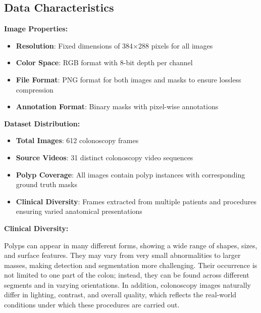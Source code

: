 \documentclass[a4paper,12pt]{report}
\begin{document}
\subsection{Data Characteristics}
\vspace{1em}

\noindent\textbf{\large Image Properties:}
\vspace{0.5em}

\begin{itemize}
    \item \textbf{Resolution}: Fixed dimensions of 384×288 pixels for all images
    \item \textbf{Color Space}: RGB format with 8-bit depth per channel
    \item \textbf{File Format}: PNG format for both images and masks to ensure lossless compression
    \item \textbf{Annotation Format}: Binary masks with pixel-wise annotations
\end{itemize}

\vspace{1em} 


\noindent\textbf{\large Dataset Distribution:}
\vspace{0.5em}

\begin{itemize}
    \item \textbf{Total Images}: 612 colonoscopy frames
    \item \textbf{Source Videos}: 31 distinct colonoscopy video sequences
    \item \textbf{Polyp Coverage}: All images contain polyp instances with corresponding ground truth masks
    \item \textbf{Clinical Diversity}: Frames extracted from multiple patients and procedures ensuring varied anatomical presentations
\end{itemize}

\vspace{1em} 


\noindent\textbf{\large Clinical Diversity:}
\vspace{0.5em}

Polyps can appear in many different forms, showing a wide range of shapes, sizes, and surface features. They may vary from very small abnormalities to larger masses, making detection and segmentation more challenging. Their occurrence is not limited to one part of the colon; instead, they can be found across different segments and in varying orientations. In addition, colonoscopy images naturally differ in lighting, contrast, and overall quality, which reflects the real-world conditions under which these procedures are carried out.
\end{document}
